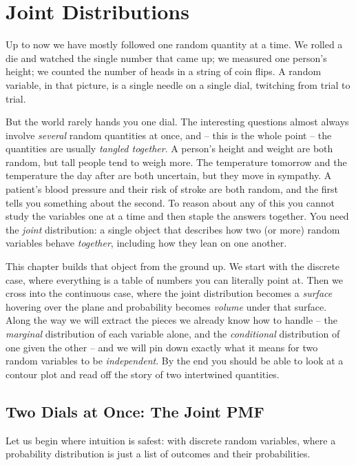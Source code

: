 \chapter{Joint Distributions}

Up to now we have mostly followed one random quantity at a time. We rolled a
die and watched the single number that came up; we measured one person's
height; we counted the number of heads in a string of coin flips. A random
variable, in that picture, is a single needle on a single dial, twitching from
trial to trial.

But the world rarely hands you one dial. The interesting questions almost always
involve \emph{several} random quantities at once, and -- this is the whole point
-- the quantities are usually \emph{tangled together}. A person's height and
weight are both random, but tall people tend to weigh more. The temperature
tomorrow and the temperature the day after are both uncertain, but they move in
sympathy. A patient's blood pressure and their risk of stroke are both random,
and the first tells you something about the second. To reason about any of this
you cannot study the variables one at a time and then staple the answers
together. You need the \emph{joint} distribution: a single object that describes
how two (or more) random variables behave \emph{together}, including how they lean
on one another.

This chapter builds that object from the ground up. We start with the discrete
case, where everything is a table of numbers you can literally point at. Then we
cross into the continuous case, where the joint distribution becomes a
\emph{surface} hovering over the plane and probability becomes \emph{volume}
under that surface. Along the way we will extract the pieces we already know how
to handle -- the \emph{marginal} distribution of each variable alone, and the
\emph{conditional} distribution of one given the other -- and we will pin down
exactly what it means for two random variables to be \emph{independent}. By the
end you should be able to look at a contour plot and read off the story of two
intertwined quantities.

\section{Two Dials at Once: The Joint PMF}
\label{ch13:joint-pmf}

Let us begin where intuition is safest: with discrete random variables, where a
probability distribution is just a list of outcomes and their probabilities.

